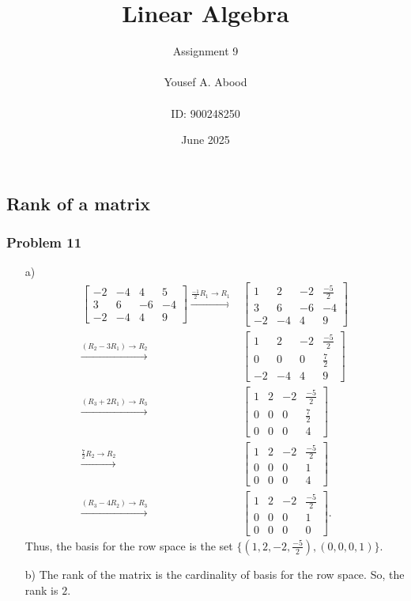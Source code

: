 \documentclass[a4paper,12pt]{article}
\title{Linear Algebra}
\author{Assignment 9\\ \\ Yousef A. Abood\\ \\ ID: 900248250}
\date{June 2025}
\begin{document}
\maketitle
\noindent\makebox[\linewidth]{\rule{15cm}{0.4pt}}
\subsection{Rank of a matrix}
\subsubsection*{Problem 11}
\begin{itemize}
    \item [a)]\begin{align*}
    \begin{bmatrix}
      -2 & -4 & 4 &5\\
      3 & 6 & -6 &-4\\
      -2 & -4 & 4 &9
    \end{bmatrix} \xrightarrow{{\frac{-1}{2}R_1}\to{R_1}}&
    \begin{bmatrix}
      1 & 2 & -2 &\frac{-5}{2}\\
      3 & 6 & -6 &-4\\
      -2 & -4 & 4 &9
    \end{bmatrix}\\ \xrightarrow{{(R_2-3R_1)}\to{R_2}}& \begin{bmatrix}
      1 & 2 & -2 &\frac{-5}{2}\\
      0 & 0 & 0 &\frac{7}{2}\\
      -2 & -4 & 4 &9
    \end{bmatrix}\\ \xrightarrow{{(R_3+2R_1)}\to{R_3}}& \begin{bmatrix}
      1 & 2 & -2 &\frac{-5}{2}\\
      0 & 0 & 0 &\frac{7}{2}\\
      0 & 0 & 0 &4
    \end{bmatrix}\\ \xrightarrow{{\frac{7}{2}R_2}\to{R_2}}& 
    \begin{bmatrix}
      1 & 2 & -2 &\frac{-5}{2}\\
      0 & 0 & 0 &1\\
      0 & 0 & 0 &4
    \end{bmatrix}\\ \xrightarrow{{(R_3-4R_2)}\to{R_3}}&
    \begin{bmatrix}
      1 & 2 & -2 &\frac{-5}{2}\\
      0 & 0 & 0 &1\\
      0 & 0 & 0 &0
    \end{bmatrix}.
\end{align*}
Thus, the basis for the row space is the set $\{(1,2,-2,\frac{-5}{2}),(0,0,0,1)\}$.
    \item[b)] The rank of the matrix is the cardinality of basis for the row space. So, the rank is $2.$
\end{itemize}
\end{document}
